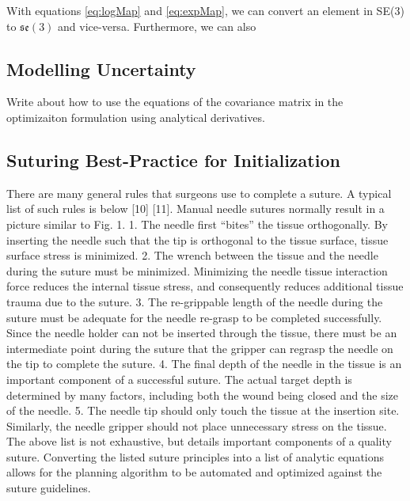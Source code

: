 \documentclass[0-suturing.tex]{subfiles}
\begin{document}
With equations \eqref{eq:logMap} and \eqref{eq:expMap}, we can convert an element in SE(3) to $\mathfrak{se}(3)$ and vice-versa. Furthermore, we can also 

\subsection{Modelling Uncertainty }
Write about how to use the equations of the covariance matrix in the optimizaiton formulation using analytical derivatives.



\subsection{Suturing Best-Practice for Initialization}
There are many general rules that surgeons use to complete
a suture. A typical list of such rules is below [10] [11].
Manual needle sutures normally result in a picture similar to
Fig. 1.
1. The needle first “bites” the tissue orthogonally. By
inserting the needle such that the tip is orthogonal to
the tissue surface, tissue surface stress is minimized.
2. The wrench between the tissue and the needle during
the suture must be minimized. Minimizing the needle
tissue interaction force reduces the internal tissue stress,
and consequently reduces additional tissue trauma due
to the suture.
3. The re-grippable length of the needle during the
suture must be adequate for the needle re-grasp to be
completed successfully. Since the needle holder can
not be inserted through the tissue, there must be an
intermediate point during the suture that the gripper can
regrasp the needle on the tip to complete the suture.
4. The final depth of the needle in the tissue is an
important component of a successful suture. The actual
target depth is determined by many factors, including
both the wound being closed and the size of the needle.
5. The needle tip should only touch the tissue at the
insertion site. Similarly, the needle gripper should not
place unnecessary stress on the tissue.
The above list is not exhaustive, but details important components
of a quality suture.
Converting the listed suture principles into a list of analytic
equations allows for the planning algorithm to be automated
and optimized against the suture guidelines.
\end{document}
